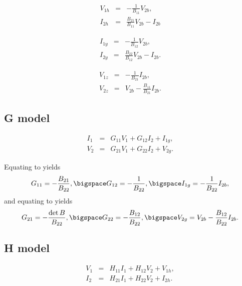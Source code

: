 \documentclass[a4paper, 12pt]{article}
\begin{document}
\begin{eqnarray}
  V_{1h} & = & -\frac{1}{B_{11}} V_{2b}, \\
  I_{2h} & = & \frac{B_{21}}{B_{11}} V_{2b} - I_{2b}
\end{eqnarray}

%
\begin{eqnarray}
  I_{1y} & = & -\frac{1}{B_{12}} V_{2b}, \\
  I_{2y} & = & \frac{B_{22}}{B_{12}} V_{2b} - I_{2b}.
\end{eqnarray}

%
\begin{eqnarray}
V_{1z} & = & -\frac{1}{B_{21}} I_{2b}, \\
V_{2z} & = & V_{2b} -\frac{B_{11}}{B_{21}} I_{2b}.
\end{eqnarray}



\subsection{G model}

\begin{eqnarray}
\label{eqn:GI1}
  I_1 & = & G_{11} V_1 + G_{12} I_2 + I_{1g}, \\
  V_2 & = & G_{21} V_1 + G_{22} I_2 + V_{2g}.
\label{eqn:GV2}
\end{eqnarray}


Equating  to  yields
%
\begin{equation}
 G_{11} = - \frac{B_{21}}{B_{22}}, \bigspace G_{12} = -\frac{1}{B_{22}}, \bigspace I_{1g} = -\frac{1}{B_{22}} I_{2b},
\end{equation}
%
and equating  to  yields
%
\begin{equation}
  G_{21} = -\frac{\det{B}}{B_{22}}, \bigspace G_{22} = -\frac{B_{12}}{B_{22}}, \bigspace V_{2g} = V_{2b} - \frac{B_{12}}{B_{22}} I_{2b}.
\end{equation}


\subsection{H model}

\begin{eqnarray}
\label{eqn:HV1}
  V_1 & = & H_{11} I_1 + H_{12} V_2 + V_{1h}, \\
  I_2 & = & H_{21} I_1 + H_{22} V_2 + I_{2h}.
\label{eqn:HI2}
\end{eqnarray}
\end{document}
